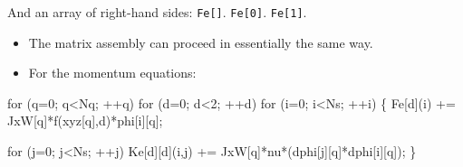 \begin{frame}[t]
\begin{block}{}
\begin{itemize}
{                { 	  And an array of right-hand sides: }
 	\only<5> {\texttt{Fe[]}.}
	\only<6> {\hspace{-0.05in}\texttt{Fe[\alert{0}]}.}
	\only<7> {\hspace{-0.1in}\texttt{Fe[\alert{1}]}.}
	}

	

    \end{itemize}
  \end{block}
\end{frame}




\begin{frame}[fragile] 
  \begin{block}{}
    \begin{itemize}    
    \item{The matrix assembly can proceed in essentially the same way.}
    \item{For the momentum equations:}
    \end{itemize}
  \end{block}
  \small
\begin{semiverbatim}
for (q=0; q<Nq; ++q) 
  \alert{for (d=0; d<2; ++d)}
    for (i=0; i<Ns; ++i) \{
      Fe\alert{[d]}(i) += JxW[q]*f(xyz[q],\alert{d})*phi[i][q];
      
      for (j=0; j<Ns; ++j)
        Ke\alert{[d][d]}(i,j) +=
	            JxW[q]*nu*(dphi[j][q]*dphi[i][q]);
    \}
\end{semiverbatim}
\end{frame}

